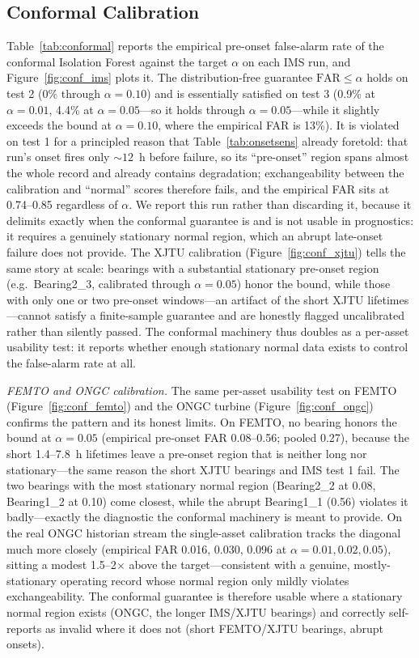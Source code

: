 \documentclass[IJPHM, 2026, 0]{PHMSociety}
\begin{document}
\subsection{Conformal Calibration}
Table~\ref{tab:conformal} reports the empirical pre-onset false-alarm rate of the conformal Isolation Forest against the target $\alpha$ on each IMS run, and Figure~\ref{fig:conf_ims} plots it. The distribution-free guarantee $\text{FAR} \le \alpha$ holds on test 2 (0\% through $\alpha=0.10$) and is essentially satisfied on test 3 (0.9\% at $\alpha=0.01$, 4.4\% at $\alpha=0.05$---so it holds through $\alpha=0.05$---while it slightly exceeds the bound at $\alpha=0.10$, where the empirical FAR is 13\%). It is violated on test 1 for a principled reason that Table~\ref{tab:onsetsens} already foretold: that run's onset fires only ${\sim}12$~h before failure, so its ``pre-onset'' region spans almost the whole record and already contains degradation; exchangeability between the calibration and ``normal'' scores therefore fails, and the empirical FAR sits at 0.74--0.85 regardless of $\alpha$. We report this run rather than discarding it, because it delimits exactly when the conformal guarantee is and is not usable in prognostics: it requires a genuinely stationary normal region, which an abrupt late-onset failure does not provide. The XJTU calibration (Figure~\ref{fig:conf_xjtu}) tells the same story at scale: bearings with a substantial stationary pre-onset region (e.g.\ Bearing2\_3, calibrated through $\alpha=0.05$) honor the bound, while those with only one or two pre-onset windows---an artifact of the short XJTU lifetimes---cannot satisfy a finite-sample guarantee and are honestly flagged uncalibrated rather than silently passed. The conformal machinery thus doubles as a per-asset usability test: it reports whether enough stationary normal data exists to control the false-alarm rate at all.

\emph{FEMTO and ONGC calibration.} The same per-asset usability test on FEMTO (Figure~\ref{fig:conf_femto}) and the ONGC turbine (Figure~\ref{fig:conf_ongc}) confirms the pattern and its honest limits. On FEMTO, no bearing honors the bound at $\alpha=0.05$ (empirical pre-onset FAR 0.08--0.56; pooled 0.27), because the short 1.4--7.8~h lifetimes leave a pre-onset region that is neither long nor stationary---the same reason the short XJTU bearings and IMS test 1 fail. The two bearings with the most stationary normal region (Bearing2\_2 at 0.08, Bearing1\_2 at 0.10) come closest, while the abrupt Bearing1\_1 (0.56) violates it badly---exactly the diagnostic the conformal machinery is meant to provide. On the real ONGC historian stream the single-asset calibration tracks the diagonal much more closely (empirical FAR 0.016, 0.030, 0.096 at $\alpha=0.01, 0.02, 0.05$), sitting a modest 1.5--2$\times$ above the target---consistent with a genuine, mostly-stationary operating record whose normal region only mildly violates exchangeability. The conformal guarantee is therefore usable where a stationary normal region exists (ONGC, the longer IMS/XJTU bearings) and correctly self-reports as invalid where it does not (short FEMTO/XJTU bearings, abrupt onsets).
\end{document}
